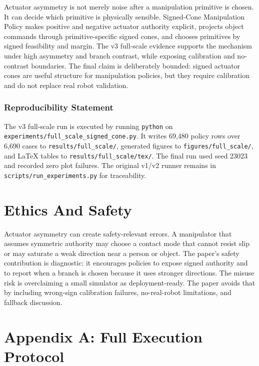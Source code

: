 \documentclass{article}
\begin{document}
Actuator asymmetry is not merely noise after a manipulation primitive is chosen. It can decide which primitive is physically sensible. Signed-Cone Manipulation Policy makes positive and negative actuator authority explicit, projects object commands through primitive-specific signed cones, and chooses primitives by signed feasibility and margin. The v3 full-scale evidence supports the mechanism under high asymmetry and branch contrast, while exposing calibration and no-contrast boundaries. The final claim is deliberately bounded: signed actuator cones are useful structure for manipulation policies, but they require calibration and do not replace real robot validation.

\subsubsection*{Reproducibility Statement}
The v3 full-scale run is executed by running \texttt{python} on \texttt{experiments/full\_scale\_signed\_cone.py}. It writes 69,480 policy rows over 6,690 cases to \texttt{results/full\_scale/}, generated figures to \texttt{figures/full\_scale/}, and \LaTeX{} tables to \texttt{results/full\_scale/tex/}. The final run used seed 23023 and recorded zero plot failures. The original v1/v2 runner remains in \texttt{scripts/run\_experiments.py} for traceability.

\section*{Ethics And Safety}

Actuator asymmetry can create safety-relevant errors. A manipulator that assumes symmetric authority may choose a contact mode that cannot resist slip or may saturate a weak direction near a person or object. The paper's safety contribution is diagnostic: it encourages policies to expose signed authority and to report when a branch is chosen because it uses stronger directions. The misuse risk is overclaiming a small simulator as deployment-ready. The paper avoids that by including wrong-sign calibration failures, no-real-robot limitations, and fallback discussion.




\appendix

\section{Appendix A: Full Execution Protocol}
\end{document}
